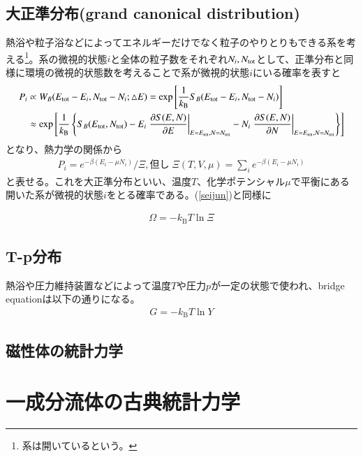 \documentclass[a4paper,12pt, oneside, openany]{jsbook}
\begin{document}
\subsection{大正準分布(grand canonical distribution)}
熱浴や粒子浴などによってエネルギーだけでなく粒子のやりとりもできる系を考える\footnote{系は開いているという。}。系の微視的状態$i$と全体の粒子数をそれぞれ$N_i,N_{\rm{tot}}$として、正準分布と同様に環境の微視的状態数を考えることで系が微視的状態$i$にいる確率を表すと
\footnotesize
\begin{eqnarray}
  \begin{split}
    P_i &\propto W_B(E_{\rm{tot}}-E_i,N_{\rm{tot}}-N_i;\bigtriangleup E) = \exp\left[\frac{1}{k_{\text{B}}}S_B(E_{\rm{tot}}-E_i,N_{\rm{tot}}-N_i)\right] \\
    &\approx  \exp\left[\frac{1}{k_{\text{B}}} \left\{S_B(E_{\rm{tot}},N_{\rm{tot}})-E_i\left.\frac{\partial S(E,N)}{\partial E
  }\right|_{E=E_{\rm{tot}},N=N_{\rm{tot}}} -N_i\left.\frac{\partial S(E,N)}{\partial N
  }\right|_{E=E_{\rm{tot}},N=N_{\rm{tot}}} \right\} \right] \\
  \end{split}
\end{eqnarray}
\normalsize
となり、熱力学の関係から
\begin{eqnarray}
  P_i=e^{-\beta (E_i-\mu N_i)}/\Xi,但し\;\Xi (T,V,\mu)= \sum_i e^{-\beta (E_i-\mu N_i)}
 \end{eqnarray}
と表せる。これを大正準分布といい、温度$T$、化学ポテンシャル$\mu$で平衡にある開いた系が微視的状態$i$をとる確率である。(\ref{seijun})と同様に

\begin{eqnarray}
  \Omega = -k_{\text{B}}T \ln \Xi 
\end{eqnarray}
\subsection{T-p分布}
熱浴や圧力維持装置などによって温度$T$や圧力$p$が一定の状態で使われ、bridge equationは以下の通りになる。
\begin{eqnarray}
  G = -k_{\text{B}}T \ln Y
\end{eqnarray}

\subsection{磁性体の統計力学}

\section{一成分流体の古典統計力学}
\end{document}
